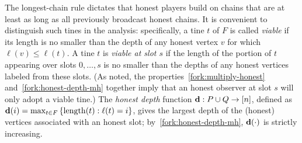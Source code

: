  The longest-chain rule dictates that honest players build on chains
 that are at least as long as all previously broadcast honest
 chains. It is convenient to distinguish such tines in the analysis:
 specifically, a tine $t$ of $F$ is called \emph{viable} if its length
 is no smaller than the depth of any honest vertex $v$ for which
 $\ell(v) \leq \ell(t)$. A tine $t$ is \emph{viable at slot $s$} if
 the length of the portion of $t$ appearing over slots $0,\ldots, s$ 
 is no smaller than the depths of any honest vertices labeled from these slots. (As noted,
 the properties~\ref{fork:multiply-honest} and~\ref{fork:honest-depth-mh}
 together imply that an honest observer at slot $s$ will only adopt a
 viable tine.)  
 The \emph{honest depth} function
 $\mathbf{d} : P \cup Q \rightarrow [n]$, 
 defined as $\mathbf{d}(i) = \max_{t \in F} \left\{ \operatorname{length}(t) : \ell(t) = i \right\}$, 
 gives the largest depth of the (honest) vertices 
 associated with an honest slot; by~\ref{fork:honest-depth-mh},
 $\mathbf{d}(\cdot)$ is strictly increasing.










